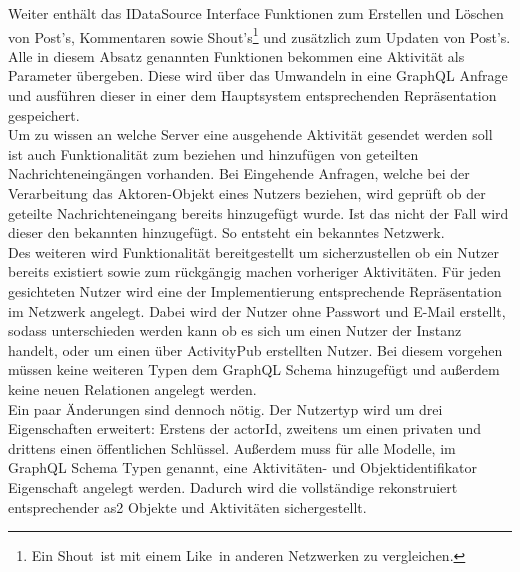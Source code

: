 Weiter enthält das IDataSource Interface Funktionen zum Erstellen und Löschen von \glqq Post's\grqq, Kommentaren sowie \glqq Shout's\grqq\footnote{Ein \glqq Shout\grqq~ist mit einem \glqq Like\grqq~in anderen Netzwerken zu vergleichen.} und zusätzlich zum Updaten von \glqq Post's\grqq. Alle in diesem Absatz genannten Funktionen bekommen eine Aktivität als Parameter übergeben. Diese wird über das Umwandeln in eine GraphQL Anfrage und ausführen dieser in einer dem Hauptsystem entsprechenden Repräsentation gespeichert.\\

Um zu wissen an welche Server eine ausgehende Aktivität gesendet werden soll ist auch Funktionalität zum beziehen und hinzufügen von geteilten Nachrichteneingängen vorhanden. Bei Eingehende Anfragen, welche bei der Verarbeitung das Aktoren-Objekt eines Nutzers beziehen, wird geprüft ob der geteilte Nachrichteneingang bereits hinzugefügt wurde. Ist das nicht der Fall wird dieser den bekannten hinzugefügt. So entsteht ein \glqq bekanntes Netzwerk\grqq.\\

Des weiteren wird Funktionalität bereitgestellt um sicherzustellen ob ein Nutzer bereits existiert sowie zum rückgängig machen vorheriger Aktivitäten. Für jeden gesichteten Nutzer wird eine der Implementierung entsprechende Repräsentation im Netzwerk angelegt. Dabei wird der Nutzer ohne Passwort und E-Mail erstellt, sodass unterschieden werden kann ob es sich um einen Nutzer der Instanz handelt, oder um einen über ActivityPub erstellten Nutzer. Bei diesem vorgehen müssen keine weiteren Typen dem GraphQL Schema hinzugefügt und außerdem keine neuen Relationen angelegt werden.\\

Ein paar Änderungen sind dennoch nötig. Der Nutzertyp wird um drei Eigenschaften erweitert: Erstens der \glqq actorId\grqq, zweitens um einen privaten und drittens einen öffentlichen Schlüssel. Außerdem muss für alle Modelle, im GraphQL Schema Typen genannt, eine Aktivitäten- und Objektidentifikator Eigenschaft angelegt werden. Dadurch wird die vollständige rekonstruiert entsprechender \gls{as2} Objekte und Aktivitäten sichergestellt.\\

